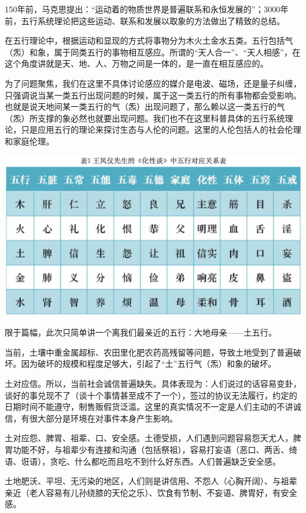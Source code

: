 \documentclass[
]{book}
\begin{document}
150年前，马克思提出：``运动着的物质世界是普遍联系和永恒发展的''；3000年前，五行系统理论把这些运动、联系和发展以取象的方法做出了精致的总结。

在五行理论中，根据运动和显现的方式将事物分为木火土金水五类。五行包括气（炁）和象，属于同类五行的事物相互感应。所谓的``天人合一''、``天人相感''，在这个角度讲就是天、地、人、万物之间是一体的，是一直在相互感应的。

为了问题聚焦，我们在这里不具体讨论感应的媒介是电波、磁场，还是量子纠缠，只强调说当某一类五行出现问题的时候，属于这一类五行的所有事物都会受影响。也就是说天地间某一类五行的气（炁）出现问题了，那么赖以这一类五行的气（炁）所支撑的象必然也就要出现问题。我们也不在这里科普具体的五行系统理论，只是应用五行的理论来探讨生态与人伦的问题。这里的人伦包括人的社会伦理和家庭伦理。

\includegraphics[width=8.33in]{images/swr3}

限于篇幅，此次只简单讲一个离我们最亲近的五行：大地母亲------土五行。

当前，土壤中重金属超标、农田里化肥农药高残留等问题，导致土地受到了普遍破坏。因为破坏的规模和程度足够大，引起了``土''五行气（炁）和象的破坏。

土对应信。所以，当前社会诚信普遍缺失。具体表现为：人们说过的话容易变卦，谈好的事兑现不了（谈十个事情甚至成不了一个），签过的协议无法履行，约定的日期时间不能遵守，制售贩假货泛滥。这里的真实情况不一定是人们主动的不讲诚信，有很大部分是环境在对事件本身产生影响。

土对应怨、脾胃、祖辈、口、安全感。土德受损，人们遇到问题容易怨天尤人，脾胃功能不好，与祖辈少有连接和沟通（包括祭祖），容易打妄语（恶口、两舌、绮语、诳语），贪吃、什么都吃而且吃不到什么好东西。人们普遍缺乏安全感。

土地肥沃、平坦、无污染的地区，人们则是讲信用、不怨人（心胸开阔）、与祖辈亲近（老人容易有儿孙绕膝的天伦之乐）、饮食有节制、不妄语、脾胃好，有安全感。
\end{document}
